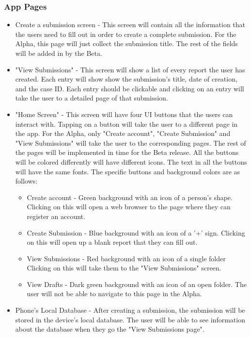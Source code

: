 \documentclass[onecolumn, draftclsnofoot, article, 10pt, compsoc]{IEEEtran}
\begin{document}
\subsubsection{App Pages}
\begin{itemize}
\item Create a submission screen - This screen will contain all the information that the users need to fill out in order to create a complete submission. For the Alpha, this page will just collect the submission title. The rest of the fields will be added in by the Beta.


\item "View Submissions" - This screen will show a list of every report the user has created.  Each entry will show show the submission's title,  date of creation, and the case ID. Each entry should be clickable and clicking on an entry will take the user to a detailed page of that submission.

\item "Home Screen" - This screen will have four UI buttons that the users can interact with. Tapping on a button will take the user to a different page in the app. For the Alpha, only "Create account", "Create Submission" and "View Submissions" will take the user to the corresponding pages. The rest of the pages will be implemented in time for the Beta release. All the buttons will be colored differently will have different icons. The text in all the buttons will have the same fonts.  The specific buttons and background colors are as follows:

\begin{itemize}
\item Create account - Green background with an icon of a person's shape. Clicking on this will open a web browser to the page where they can register an account.
\item Create Submission - Blue background with an icon of a '+' sign. Clicking on this will open up a blank report that they can fill out.
\item View Submissions - Red background with an icon of a single folder Clicking on this will take them to the "View Submissions" screen.
\item View Drafts - Dark green background with an icon of an open folder. The user will not be able to navigate to this page in the Alpha.
\end{itemize}


\item Phone's Local Database - After creating a submission, the submission will be stored in the device's local database. The user will be able to see information about the database when they go the "View Submissions page".


\end{itemize}
\end{document}
